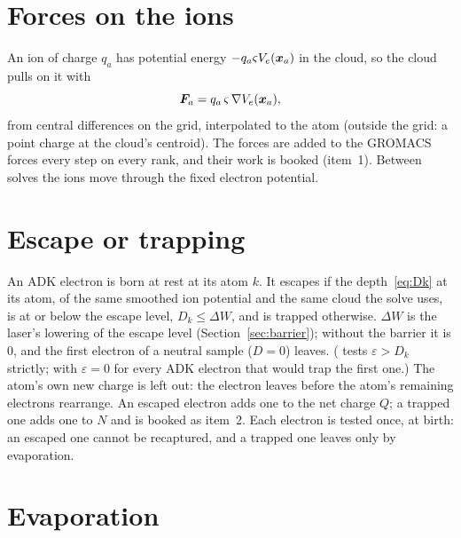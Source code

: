 \section{Forces on the ions}

An ion of charge $q_a$ has potential energy $-q_a\varsigma V_e(\bm{x}_a)$ in the cloud, so the cloud pulls on it with
\begin{equation}
  \bm{F}_a = q_a\,\varsigma\,\nabla V_e(\bm{x}_a),
\end{equation}
from central differences on the grid, interpolated to the atom (outside the grid: a point charge at the cloud's
centroid).
The forces are added to the GROMACS forces every step on every rank, and their work is booked (item~1).
Between solves the ions move through the fixed electron potential.

\section{Escape or trapping}
\label{sec:escape}

An ADK electron is born at rest at its atom $k$.
It escapes if the depth~\eqref{eq:Dk} at its atom, of the same smoothed ion potential and the same cloud the solve
uses, is at or below the escape level, $D_k\le\Delta W$, and is trapped otherwise.
$\Delta W$ is the laser's lowering of the escape level (Section~\ref{sec:barrier}); without the barrier it is 0, and
the first electron of a neutral sample ($D=0$) leaves.
( tests $\varepsilon > D_k$ strictly; with $\varepsilon = 0$ for every ADK electron that would trap
the first one.)
The atom's own new charge is left out: the electron leaves before the atom's remaining electrons rearrange.
An escaped electron adds one to the net charge $Q$; a trapped one adds one to $N$ and is booked as item~2.
Each electron is tested once, at birth: an escaped one cannot be recaptured, and a trapped one leaves only by
evaporation.

\section{Evaporation}
\label{sec:evaporation}

